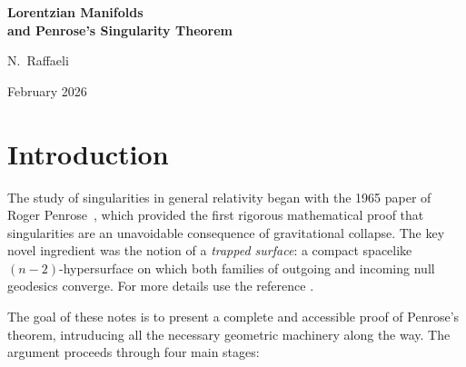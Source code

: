 \documentclass[12pt, a4paper]{article}
\theoremstyle{plain}
\theoremstyle{definition}
\theoremstyle{remark}
\begin{document}
\begin{titlepage}
  \centering
  \vspace*{2cm}

  {\LARGE\bfseries Lorentzian Manifolds\\[0.4em]
   and Penrose's Singularity Theorem}

  \vspace{1.5cm}

  {\large N.\ Raffaeli}

  {\normalsize February 2026}

  \vspace{2cm}

  \begin{abstract}
    \noindent
    These notes present a self-contained treatment of the geometry of
    Lorentzian manifolds culminating in a proof of Penrose's singularity
    theorem (1965). We develop the necessary causal theory---globally
    hyperbolic spacetimes, trapped surfaces, Jacobi fields along null
    geodesics, and the index form---before proving that any spacetime
    satisfying the null energy condition and containing a compact trapped
    surface (together with a non-compact Cauchy surface) must be
    future null geodesically incomplete.
  \end{abstract}
\end{titlepage}

\tableofcontents
\newpage

\section{Introduction}

The study of singularities in general relativity began with the 1965 paper of Roger Penrose~\cite{Penrose1965}, which
provided the first rigorous mathematical proof that singularities are
an unavoidable consequence of gravitational collapse. The key novel ingredient was the notion of a \emph{trapped surface}: a compact spacelike $(n-2)$-hypersurface on which both families of outgoing and incoming null geodesics converge. For more details use the reference \cite{KunzingerSteinbauer}.

\medskip

The goal of these notes is to present a complete and accessible proof
of Penrose's theorem, intruducing all the necessary geometric machinery
along the way. The argument proceeds through four main stages:
\end{document}
